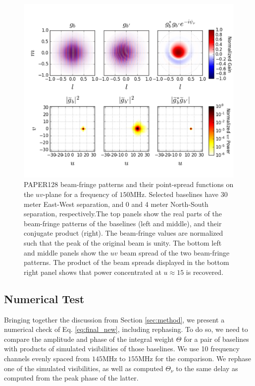 \documentclass[twocolumn,apj,numberedappendix]{emulateapj}
\renewcommand\[{\begin{equation}}
\renewcommand\]{\end{equation}}
\begin{document}
\begin{figure}[h!]
\includegraphics[width=\textwidth]{BeamFringe}

\caption{PAPER128 beam-fringe patterns and their point-spread functions on the $uv$-plane for a frequency of $150$MHz. Selected baselines have 30 meter East-West separation, and 0 and 4 meter North-South separation, respectively.The top panels show the real parts of the beam-fringe patterns of the baselines (left and middle), and their conjugate product (right). The beam-fringe values are normalized such that the peak of the original beam is unity. 
The bottom left and middle panels show the $uv$ beam spread of the two beam-fringe patterns. The product of the beam spreads displayed in the bottom right panel shows that power concentrated at $u\approx15$ is recovered. }
\label{fig:beamfringe}
\end{figure}


\subsection{Numerical Test \label{sec:Techniquet}}

Bringing together the discussion from Section \ref{sec:method}, we present a numerical check of Eq. \eqref{eq:final_new}, including rephasing. To do so, we need to compare the amplitude and phase of the integral weight $\Theta$ 
for a pair of baselines with products of simulated visibilities of those baselines. We use 10 frequency channels evenly spaced from $145$MHz to $155$MHz for the comparison. We rephase one of the simulated visibilities, as well as computed $\Theta_{\nu}$ to the same delay as computed from the peak phase of the latter. 
 
\end{document}
